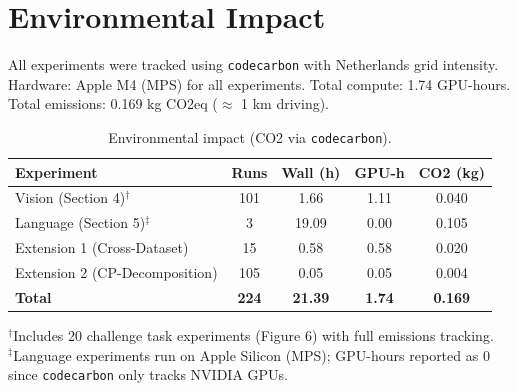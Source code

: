 
\section{Environmental Impact}
\label{app:environmental}

All experiments were tracked using \texttt{codecarbon} with Netherlands grid intensity.
Hardware: Apple M4 (MPS) for all experiments.
Total compute: 1.74 GPU-hours.
Total emissions: 0.169 kg CO2eq ($\approx$ 1 km driving).

\begin{table}[H]
    \caption{Environmental impact (CO2 via \texttt{codecarbon}).}
    \label{tab:environmental}
    \centering
    \small
    \begin{tabular}{lcccc}
        \toprule
        Experiment & Runs & Wall (h) & GPU-h & CO2 (kg) \\
        \midrule
        Vision (Section 4)$^\dagger$ & 101 & 1.66 & 1.11 & 0.040 \\
        Language (Section 5)$^\ddagger$ & 3 & 19.09 & 0.00 & 0.105 \\
        Extension 1 (Cross-Dataset) & 15 & 0.58 & 0.58 & 0.020 \\
        Extension 2 (CP-Decomposition) & 105 & 0.05 & 0.05 & 0.004 \\
        \midrule
        \textbf{Total} & \textbf{224} & \textbf{21.39} & \textbf{1.74} & \textbf{0.169} \\
        \bottomrule
    \end{tabular}
    
    \vspace{0.5em}
    \footnotesize
    $^\dagger$Includes 20 challenge task experiments (Figure 6) with full emissions tracking.\\
    $^\ddagger$Language experiments run on Apple Silicon (MPS); GPU-hours reported as 0 since \texttt{codecarbon} only tracks NVIDIA GPUs.
\end{table}
